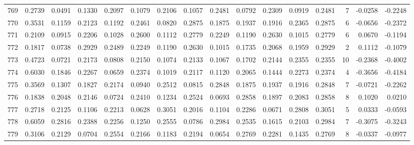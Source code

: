 \begin{tabular}{lrrrrrrrrrrrrrrr}
769 &      0.2739 &  0.0491 &  0.1330 &  0.2097 &  0.1079 &  0.2106 &  0.1057 &  0.2481 &  0.0792 &  0.2309 &   0.0919 &     0.2481 &      7 &                   -0.0258 &                    -0.2248 \\
770 &      0.3531 &  0.1159 &  0.2123 &  0.1192 &  0.2461 &  0.0820 &  0.2875 &  0.1875 &  0.1937 &  0.1916 &   0.2365 &     0.2875 &      6 &                   -0.0656 &                    -0.2372 \\
771 &      0.2109 &  0.0915 &  0.2206 &  0.1028 &  0.2600 &  0.1112 &  0.2779 &  0.2249 &  0.1190 &  0.2630 &   0.1015 &     0.2779 &      6 &                    0.0670 &                    -0.1194 \\
772 &      0.1817 &  0.0738 &  0.2929 &  0.2489 &  0.2249 &  0.1190 &  0.2630 &  0.1015 &  0.1735 &  0.2068 &   0.1959 &     0.2929 &      2 &                    0.1112 &                    -0.1079 \\
773 &      0.4723 &  0.0721 &  0.2173 &  0.0808 &  0.2150 &  0.1074 &  0.2133 &  0.1067 &  0.1702 &  0.2144 &   0.2355 &     0.2355 &     10 &                   -0.2368 &                    -0.4002 \\
774 &      0.6030 &  0.1846 &  0.2267 &  0.0659 &  0.2374 &  0.1019 &  0.2117 &  0.1120 &  0.2065 &  0.1444 &   0.2273 &     0.2374 &      4 &                   -0.3656 &                    -0.4184 \\
775 &      0.3569 &  0.1307 &  0.1827 &  0.2174 &  0.0940 &  0.2512 &  0.0815 &  0.2848 &  0.1875 &  0.1937 &   0.1916 &     0.2848 &      7 &                   -0.0721 &                    -0.2262 \\
776 &      0.1838 &  0.2048 &  0.2146 &  0.0724 &  0.2410 &  0.1234 &  0.2524 &  0.0693 &  0.2858 &  0.1897 &   0.2083 &     0.2858 &      8 &                    0.1020 &                     0.0210 \\
777 &      0.2718 &  0.2125 &  0.1106 &  0.2213 &  0.0628 &  0.3051 &  0.2016 &  0.1104 &  0.2286 &  0.0671 &   0.2808 &     0.3051 &      5 &                    0.0333 &                    -0.0593 \\
778 &      0.6059 &  0.2816 &  0.2388 &  0.2256 &  0.1250 &  0.2555 &  0.0786 &  0.2984 &  0.2535 &  0.1615 &   0.2103 &     0.2984 &      7 &                   -0.3075 &                    -0.3243 \\
779 &      0.3106 &  0.2129 &  0.0704 &  0.2554 &  0.2166 &  0.1183 &  0.2194 &  0.0654 &  0.2769 &  0.2281 &   0.1435 &     0.2769 &      8 &                   -0.0337 &                    -0.0977 \\

\end{tabular}
